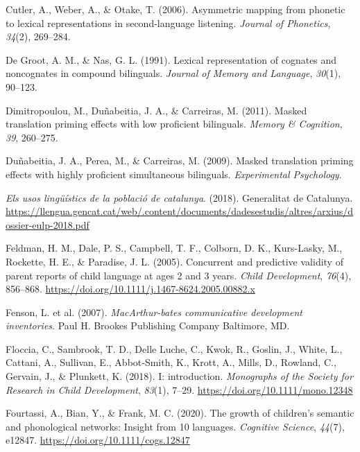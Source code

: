 \documentclass[
]{article}
\newlength{\cslhangindent}
\newlength{\cslentryspacingunit} %
\newenvironment{CSLReferences}[2] %
 {%
  \setlength{\parindent}{0pt}
  \ifodd #1
  \let\oldpar\par
  \def\par{\hangindent=\cslhangindent\oldpar}
  \fi
  \setlength{\parskip}{#2\cslentryspacingunit}
 }%
 {}
\begin{document}
\begin{CSLReferences}{1}{0}
\leavevmode{}%
Cutler, A., Weber, A., \& Otake, T. (2006). Asymmetric mapping from
phonetic to lexical representations in second-language listening.
\emph{Journal of Phonetics}, \emph{34}(2), 269--284.

\leavevmode{}%
De Groot, A. M., \& Nas, G. L. (1991). Lexical representation of
cognates and noncognates in compound bilinguals. \emph{Journal of Memory
and Language}, \emph{30}(1), 90--123.

\leavevmode{}%
Dimitropoulou, M., Duñabeitia, J. A., \& Carreiras, M. (2011). Masked
translation priming effects with low proficient bilinguals. \emph{Memory
\& Cognition}, \emph{39}, 260--275.

\leavevmode{}%
Duñabeitia, J. A., Perea, M., \& Carreiras, M. (2009). Masked
translation priming effects with highly proficient simultaneous
bilinguals. \emph{Experimental Psychology}.

\leavevmode{}%
\emph{Els usos lingüístics de la població de catalunya}. (2018).
Generalitat de Catalunya.
\url{https://llengua.gencat.cat/web/.content/documents/dadesestudis/altres/arxius/dossier-eulp-2018.pdf}

\leavevmode{}%
Feldman, H. M., Dale, P. S., Campbell, T. F., Colborn, D. K.,
Kurs-Lasky, M., Rockette, H. E., \& Paradise, J. L. (2005). Concurrent
and predictive validity of parent reports of child language at ages 2
and 3 years. \emph{Child Development}, \emph{76}(4), 856--868.
\url{https://doi.org/10.1111/j.1467-8624.2005.00882.x}

\leavevmode{}%
Fenson, L. et al. (2007). \emph{{MacArthur}-bates communicative
development inventories}. Paul H. Brookes Publishing Company Baltimore,
{MD}.

\leavevmode{}%
Floccia, C., Sambrook, T. D., Delle Luche, C., Kwok, R., Goslin, J.,
White, L., Cattani, A., Sullivan, E., Abbot‐Smith, K., Krott, A., Mills,
D., Rowland, C., Gervain, J., \& Plunkett, K. (2018). I: introduction.
\emph{Monographs of the Society for Research in Child Development},
\emph{83}(1), 7--29. \url{https://doi.org/10.1111/mono.12348}

\leavevmode{}%
Fourtassi, A., Bian, Y., \& Frank, M. C. (2020). The growth of
children's semantic and phonological networks: Insight from 10
languages. \emph{Cognitive Science}, \emph{44}(7), e12847.
\url{https://doi.org/10.1111/cogs.12847}


\end{CSLReferences}
\end{document}
